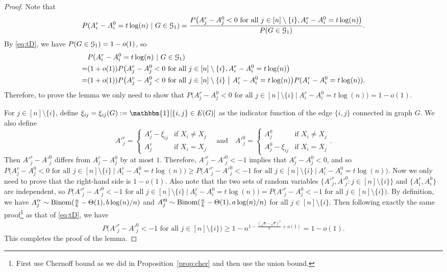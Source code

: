 \documentclass{article}
\begin{document}
\begin{proof}
Note that 
$$
P(A^r_i-A^0_i= t\log(n)~|~G\in\mathcal{G}_1)
=\frac{P \big(A^r_j-A^0_j<0\text{~for all~} j\in[n]\setminus\{i\}, A^r_i-A^0_i= t\log(n) \big)}{P(G\in\mathcal{G}_1)} .
$$
By \eqref{eq:tD}, we have $P(G\in\mathcal{G}_1)=1-o(1)$, so
\begin{align*}
& P(A^r_i-A^0_i= t\log(n)~|~G\in\mathcal{G}_1) \\
= & (1+o(1)) P \big(A^r_j-A^0_j<0\text{~for all~} j\in[n]\setminus\{i\}, A^r_i-A^0_i= t\log(n) \big) \\
= & (1+o(1)) P \big(A^r_j-A^0_j<0\text{~for all~} j\in[n]\setminus\{i\} ~\big|~ A^r_i-A^0_i= t\log(n) \big) P(A^r_i-A^0_i= t\log(n)) .
\end{align*}
Therefore, to prove the lemma we only need to show that $P \big(A^r_j-A^0_j<0\text{~for all~} j\in[n]\setminus\{i\} ~\big|~ A^r_i-A^0_i= t\log(n) \big)=1-o(1)$. 

For $j\in[n]\setminus\{i\}$, define $\xi_{ij}=\xi_{ij}(G):=\mathbbm{1}[\{i,j\}\in E(G)]$ as the indicator function of the edge $\{i,j\}$ connected in graph $G$. We also define 
$$
A'^r_j=\left\{
\begin{array}{cl}
  A^r_j-\xi_{ij}   & \mbox{if~} X_i\neq X_j \\
  A^r_j   &   \mbox{if~} X_i= X_j
\end{array}
\right.
\quad \text{and} \quad
A'^0_j=\left\{
\begin{array}{cl}
  A^0_j   & \mbox{if~} X_i\neq X_j \\
  A^0_j-\xi_{ij}   &   \mbox{if~} X_i= X_j
\end{array}
\right. .
$$
Then $A'^r_j-A'^0_j$ differs from $A^r_j-A^0_j$ by at most $1$.
Therefore, $A'^r_j-A'^0_j<-1$ implies that $A^r_j-A^0_j<0$,
and so $P \big(A^r_j-A^0_j<0\text{~for all~} j\in[n]\setminus\{i\} ~\big|~ A^r_i-A^0_i= t\log(n) \big) \ge P \big(A'^r_j-A'^0_j<-1 \text{~for all~} j\in[n]\setminus\{i\} ~\big|~ A^r_i-A^0_i= t\log(n) \big)$.
Now we only need to prove that the right-hand side is $1-o(1)$.
Also note that the two sets of random variables $\{A'^r_j,A'^0_j:j\in[n]\setminus\{i\}\}$ and $\{A^r_i,A^0_i\}$ are independent,
so $P \big(A'^r_j-A'^0_j<-1 \text{~for all~} j\in[n]\setminus\{i\} ~\big|~ A^r_i-A^0_i= t\log(n) \big)=P \big(A'^r_j-A^0_j<-1 \text{~for all~} j\in[n]\setminus\{i\}  \big)$.
By definition, we have
$A'^r_j\sim\operatorname{Binom}(\frac{n}{k}-\Theta(1),b\log(n)/n)$
and $A'^0_j\sim\operatorname{Binom}(\frac{n}{k}-\Theta(1),a\log(n)/n)$ for all $j\in[n]\setminus\{i\}$.
Then following exactly the same proof\footnote{First use Chernoff bound as we did in Proposition~\ref{prop:cher} and then use the union bound.} as that of \eqref{eq:tD}, we have
$$
P \big(A'^r_j-A'^0_j <-1 \text{~for all~} j\in[n]\setminus\{i\}  \big)
\ge 1- n^{1-\frac{(\sqrt{a}-\sqrt{b})^2}{k} +o(1)} = 1-o(1).
$$
This completes the proof of the lemma.
\end{proof}
\end{document}

